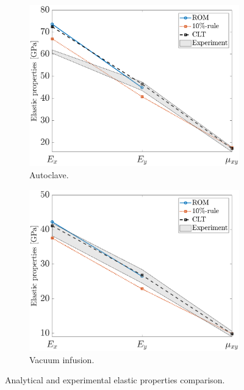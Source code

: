 \documentclass{article}
\begin{document}
\begin{figure}[h]
    \begin{subfigure}{0.5\textwidth}
        \includegraphics[width=1\linewidth, height=0.8\linewidth]{figures/autoclave.eps} 
        \caption{Autoclave.}
    \end{subfigure}
    \begin{subfigure}{0.5\textwidth}
        \includegraphics[width=1\linewidth, height=0.8\linewidth]{figures/vacuum_infusion.eps} 
        \caption{Vacuum infusion.}
    \end{subfigure}
    \caption{Analytical and experimental elastic properties comparison.}
    \label{fig:elastic_properties_envelope}
\end{figure}
\end{document}
